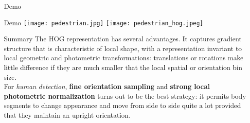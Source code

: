\begin{frame}[standout]
  \huge Demo
\end{frame}

\begin{frame}{Demo}
  \centering
  \texttt{[image: pedestrian.jpg]}
  \hspace{2mm}
  \texttt{[image: pedestrian\_hog.jpeg]}
\end{frame}

\begin{frame}{Summary}
  The HOG representation has several advantages. It captures gradient
  structure that is characteristic of local shape, with a representation invariant
  to local geometric and photometric transformations: translations or rotations make little difference
  if they are much smaller that the local spatial or orientation bin size. \\
  \vspace{5mm}
  For \textit{human detection}, \textbf{fine orientation sampling} and \textbf{strong
  local photometric normalization} turns out to be the best strategy: it permits body
  segments to change appearance and move from side to side quite a lot provided
  that they maintain an upright orientation.

\end{frame}
